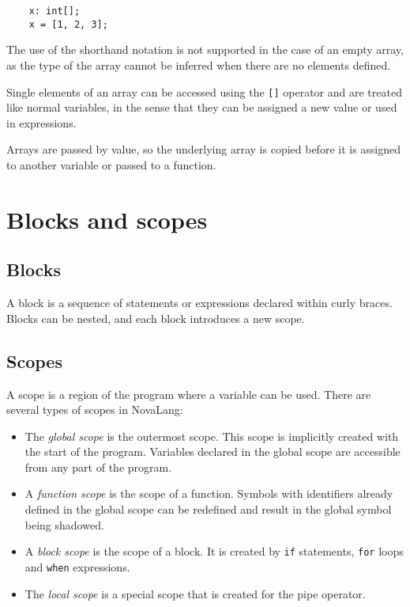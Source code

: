 \documentclass[conference]{IEEEtran}
\begin{document}
\begin{lstlisting}
    x: int[];
    x = [1, 2, 3];
\end{lstlisting}

The use of the shorthand notation is not supported in the case of an empty array, as the type of the array cannot be inferred when there are no elements defined.

Single elements of an array can be accessed using the \texttt{[]} operator and are treated like normal variables, in the sense that they can be assigned a new value or used in expressions.

Arrays are passed by value, so the underlying array is copied before it is assigned to another variable or passed to a function.

\section{Blocks and scopes}

\subsection{Blocks}
A block is a sequence of statements or expressions declared within curly braces.
Blocks can be nested, and each block introduces a new scope.

\subsection{Scopes}
A scope is a region of the program where a variable can be used.
There are several types of scopes in NovaLang:
\begin{itemize}
    \item The \emph{global scope} is the outermost scope. This scope is implicitly created with the start of the program. Variables declared in the global scope are accessible from any part of the program.
    \item A \emph{function scope} is the scope of a function. Symbols with identifiers already defined in the global scope can be redefined and result in the global symbol being shadowed.
    \item A \emph{block scope} is the scope of a block. It is created by \texttt{if} statements, \texttt{for} loops and \texttt{when} expressions.
    \item The \emph{local scope} is a special scope that is created for the pipe operator.
\end{itemize}
\end{document}
